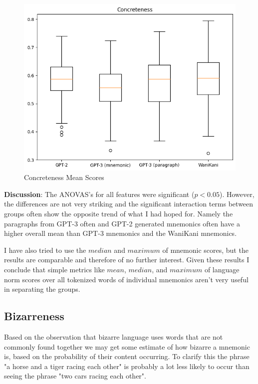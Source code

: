 \begin{figure}
    \centering
    \includegraphics[width=400pt]{resources/concr_mean_box_plot.png}
    \caption{Concreteness Mean Scores}
    \label{figure:concr_mean_box_plot}
\end{figure}
\textbf{Discussion}: The ANOVAS's for all features were significant ($p < 0.05$). However, the differences are not very striking and the significant interaction terms between groups often show the opposite trend of what I had hoped for. Namely the paragraphs from GPT-3 often and GPT-2 generated mnemonics often have a higher overall mean than GPT-3 mnemonics and the WaniKani mnemonics.

I have also tried to use the $median$ and $maximum$ of mnemonic scores, but the results are comparable and therefore of no further interest. Given these results I conclude that simple metrics like $mean$, $median$, and $maximum$ of language norm scores over all tokenized words of individual mnemonics aren't very useful in separating the groups.
\subsection{Bizarreness}
Based on the observation that bizarre language uses words that are not commonly found together we may get some estimate of how bizarre a mnemonic is, based on the probability of their content occurring. To clarify this the phrase "a horse and a tiger racing each other" is probably a lot less likely to occur than seeing the phrase "two cars racing each other".

